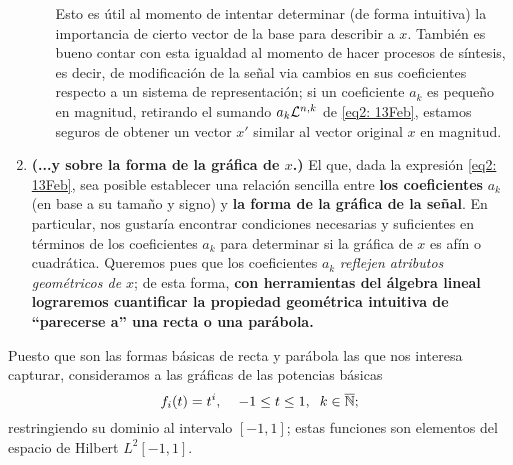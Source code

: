 \begin{listaObj}
\begin{enumerate}
\begin{itemize}
Esto es útil al momento
de intentar determinar
(de forma intuitiva) 
la importancia 
de cierto vector de la base para describir a $x$.
También es bueno contar con esta igualdad
al momento de hacer procesos de síntesis,
es decir, de modificación de la señal
via cambios en sus coeficientes respecto
a un sistema de representación; si un coeficiente
$a_{k}$ es pequeño en magnitud, retirando el sumando
$a_{k} \mathcal{L}^{n,k}$ de \eqref{eq2: 13Feb}, 
estamos seguros de obtener
un vector $x'$ similar al vector original $x$
en magnitud.
\end{itemize}
\item \textbf{
\textcolor{ameMorado}{(...y sobre la forma de la
gráfica de $x$.)}} El que,
dada la expresión \eqref{eq2: 13Feb},
sea posible establecer
una relación sencilla entre \textbf{los coeficientes }
$a_{k}$
(en base a su tamaño y signo) y
\textbf{la forma de la gráfica de la señal}.
En particular, nos gustaría encontrar condiciones
necesarias y suficientes 
en términos de los coeficientes $a_{k}$ para determinar
si la gráfica de $x$ es afín o cuadrática.
Queremos pues que los coeficientes $a_{k}$
\textit{reflejen atributos geométricos de $x$};
de esta forma, 
\textbf{con herramientas del álgebra lineal lograremos cuantificar
la propiedad geométrica intuitiva de ``parecerse a''
una recta o una parábola.}
\end{enumerate} 

\end{listaObj}


\begin{comment}
Nuestro acercamiento es como sigue:
\end{comment}
Puesto que son las
formas básicas de recta y parábola las que nos interesa
capturar,
consideramos a las gráficas de las potencias básicas
\begin{equation}
\label{eq0: 8En}
f_{i}(t)= t^{i}, \hspace{0.4cm}
-1 \leq t \leq 1, \hspace{0.2cm}
 k \in \overline{\mathbb{N}};
\end{equation}
restringiendo su dominio al intervalo $[-1,1]$;
estas funciones son 
elementos del 
espacio de Hilbert $L^{2}[-1,1]$. 


